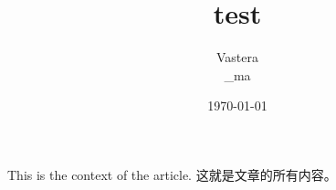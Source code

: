 \documentclass[UTF8]{ctexart}
\title{test}
\author{Vastera\\_ma}
\date{\today}
\begin{document}
 
    \maketitle
    
    This is the context of the article.
    这就是文章的所有内容。
    ​
    
\end{document}
